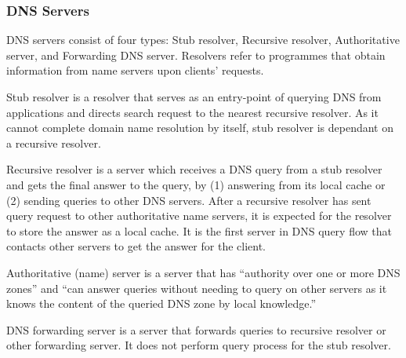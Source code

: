 \documentclass[a4paper,12pt]{article}
\begin{document}
\subsubsection{DNS Servers}
DNS servers consist of four types: Stub resolver, Recursive resolver, Authoritative server, and Forwarding DNS server. Resolvers refer to programmes that obtain information from name servers upon clients' requests\cite{rfc1034}.

Stub resolver is a resolver that serves as an entry-point of querying DNS from applications and directs search request to the nearest recursive resolver\cite{rfc1123}. As it cannot complete domain name resolution by itself, stub resolver is dependant on a recursive resolver\cite{rfc8499}.

Recursive resolver is a server which receives a DNS query from a stub resolver and gets the final answer to the query, by (1) answering from its local cache or (2) sending queries to other DNS servers\cite{rfc8499}. After a recursive resolver has sent query request to other authoritative name servers, it is expected for the resolver to store the answer as a local cache. It is the first server in DNS query flow that contacts other servers to get the answer for the client. 

Authoritative (name) server is a server that has ``authority over one or more DNS zones\cite{rfc8499}'' and ``can answer queries without needing to query on other servers as it knows the content of the queried DNS zone by local knowledge\cite{rfc2182}.''

DNS forwarding server is a server that forwards queries to recursive resolver or other forwarding server. It does not perform query process for the stub resolver.
\end{document}
